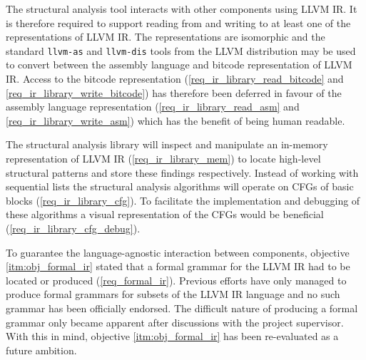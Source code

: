 The structural analysis tool interacts with other components using LLVM IR. It is therefore required to support reading from and writing to at least one of the representations of LLVM IR. The representations are isomorphic and the standard \texttt{llvm-as} and \texttt{llvm-dis} tools from the LLVM distribution may be used to convert between the assembly language and bitcode representation of LLVM IR. Access to the bitcode representation (\ref{req_ir_library_read_bitcode} and \ref{req_ir_library_write_bitcode}) has therefore been deferred in favour of the assembly language representation (\ref{req_ir_library_read_asm} and \ref{req_ir_library_write_asm}) which has the benefit of being human readable.

The structural analysis library will inspect and manipulate an in-memory representation of LLVM IR (\ref{req_ir_library_mem}) to locate high-level structural patterns and store these findings respectively. Instead of working with sequential lists the structural analysis algorithms will operate on CFGs of basic blocks (\ref{req_ir_library_cfg}). To facilitate the implementation and debugging of these algorithms a visual representation of the CFGs would be beneficial (\ref{req_ir_library_cfg_debug}).

To guarantee the language-agnostic interaction between components, objective \ref{itm:obj_formal_ir} stated that a formal grammar for the LLVM IR had to be located or produced (\ref{req_formal_ir}). Previous efforts have only managed to produce formal grammars for subsets of the LLVM IR language \cite{formal_llvm_ir_spec,formalizing_llvm_ir} and no such grammar has been officially endorsed. The difficult nature of producing a formal grammar only became apparent after discussions with the project supervisor. With this in mind, objective \ref{itm:obj_formal_ir} has been re-evaluated as a future ambition.

